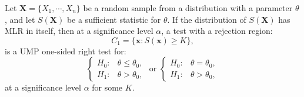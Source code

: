 \documentclass{huhtakm-template-book-v2}
\begin{document}
    \begin{thm}
        Let $\mathbf{X}=\{X_{1},\cdots,X_{n}\}$ be a random sample from a distribution with a parameter $\theta$, and let $S(\mathbf{X})$ be a sufficient statistic for $\theta$. If the distribution of $S(\mathbf{X})$ has MLR in itself, then at a significance level $\alpha$, a test with a rejection region:
        \begin{equation*}
            C_{1}=\{\mathbf{x}:S(\mathbf{x})\geq K\},
        \end{equation*}
        is a UMP one-sided right test for:
        \begin{equation*}
            \begin{cases}
                H_{0}: &\theta\leq\theta_{0},\\
                H_{1}: &\theta>\theta_{0},
            \end{cases}\text{ or }\begin{cases}
                H_{0}: &\theta=\theta_{0},\\
                H_{1}: &\theta>\theta_{0},
            \end{cases}
        \end{equation*}
        at a significance level $\alpha$ for some $K$.
    \end{thm}
\end{document}
